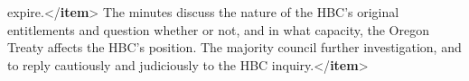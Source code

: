 \begin{shaded}
\hspace*{1em}\hspace*{1em}\hspace*{1em}\hspace*{1em}\hspace*{1em}\hspace*{1em} expire.{</\textbf{item}>}\mbox{}\newline 
\hspace*{1em}\hspace*{1em}The minutes discuss the nature of the HBC's\mbox{}\newline 
\hspace*{1em}\hspace*{1em}\hspace*{1em}\hspace*{1em}\hspace*{1em}\hspace*{1em} original entitlements and question whether or not,\mbox{}\newline 
\hspace*{1em}\hspace*{1em}\hspace*{1em}\hspace*{1em}\hspace*{1em}\hspace*{1em} and in what capacity, the Oregon Treaty affects the\mbox{}\newline 
\hspace*{1em}\hspace*{1em}\hspace*{1em}\hspace*{1em}\hspace*{1em}\hspace*{1em} HBC's position. The majority council further\mbox{}\newline 
\hspace*{1em}\hspace*{1em}\hspace*{1em}\hspace*{1em}\hspace*{1em}\hspace*{1em} investigation, and to reply cautiously and\mbox{}\newline 
\hspace*{1em}\hspace*{1em}\hspace*{1em}\hspace*{1em}\hspace*{1em}\hspace*{1em} judiciously to the HBC inquiry.{</\textbf{item}>}\mbox{}\newline 

\end{shaded}
